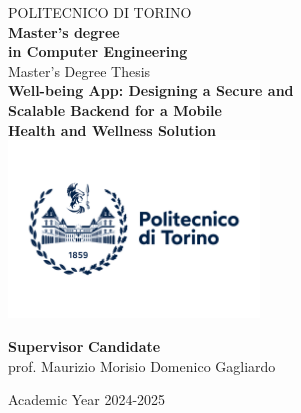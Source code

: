 \begin{titlepage}
    
    \begin{center}
    
    {\huge POLITECNICO DI TORINO}\\[1.5cm]
    \textbf{Master’s degree\\in Computer Engineering}\\[3cm]
    
    {\Large Master's Degree Thesis}\\[0.5cm]
    \textbf{\LARGE Well-being App: Designing a Secure and\\[-0.2cm]Scalable Backend for a Mobile\\[0.2cm]Health and Wellness Solution}\\[2cm]
    \includegraphics[width=0.5\textwidth]{./images/logoPoliTo_with_name_2021.jpg}
    \vspace{2cm}
    
    
    \begin{minipage}{0.85\textwidth}
    \begin{flushleft}\large
    \textbf{Supervisor} \hfill \textbf{Candidate}\\
    prof. Maurizio Morisio \hfill Domenico Gagliardo\\
    \end{flushleft}
    \end{minipage}
    
    \vfill
    
    Academic Year 2024-2025
    \end{center}
    
    \restoregeometry %
    
\end{titlepage}

\begin{titlepage}
\begin{spacing}{\myspacing}
    
\end{spacing}

\tableofcontents

\end{titlepage}